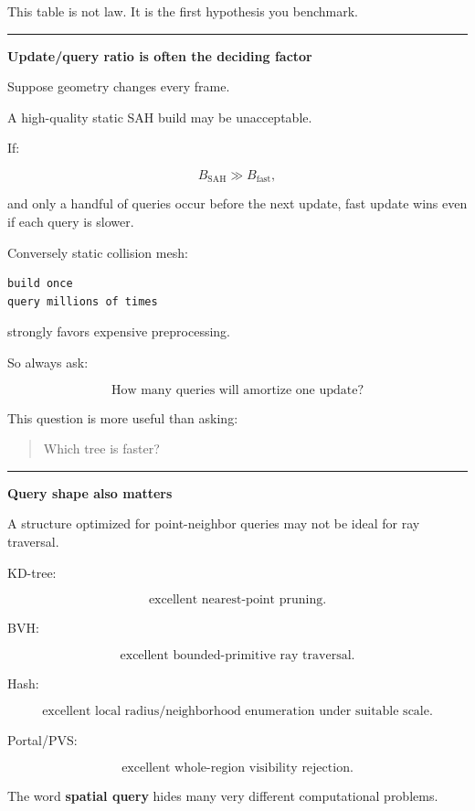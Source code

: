 This table is not law. It is the first hypothesis you benchmark.

\begin{center}\rule{0.5\linewidth}{0.5pt}\end{center}

\textbf{Update/query ratio is often the deciding factor}

Suppose geometry changes every frame.

A high-quality static SAH build may be unacceptable.

If:

\[
B_{\text{SAH}}
\gg
B_{\text{fast}},
\]

and only a handful of queries occur before the next update, fast update wins even if each query is slower.

Conversely static collision mesh:

\begin{verbatim}
build once
query millions of times
\end{verbatim}

strongly favors expensive preprocessing.

So always ask:

\[
\boxed{
\text{How many queries will amortize one update?}
}
\]

This question is more useful than asking:

\begin{quote}
Which tree is faster?
\end{quote}

\begin{center}\rule{0.5\linewidth}{0.5pt}\end{center}

\textbf{Query shape also matters}

A structure optimized for point-neighbor queries may not be ideal for ray traversal.

KD-tree:

\[
\text{excellent nearest-point pruning}.
\]

BVH:

\[
\text{excellent bounded-primitive ray traversal}.
\]

Hash:

\[
\text{excellent local radius/neighborhood enumeration under suitable scale}.
\]

Portal/PVS:

\[
\text{excellent whole-region visibility rejection}.
\]

The word \textbf{spatial query} hides many very different computational problems.


